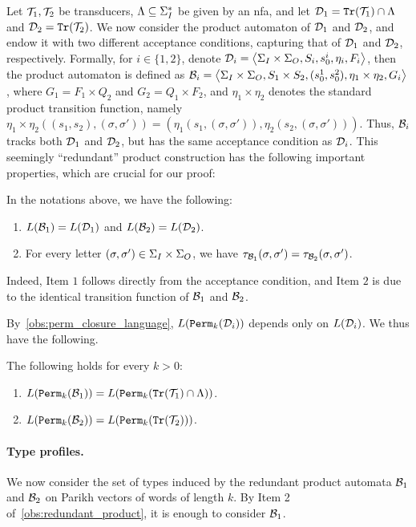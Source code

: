 Let $\mathcal{T}_1,\mathcal{T}_2$ be transducers, $\Lambda\subseteq \Sigma_{I}^*$ be given by an \gls{nfa}, and let $\mathcal{D}_1={\mathtt{Tr}}(\mathcal{T}_1)\cap \Lambda$ and $\mathcal{D}_2={\mathtt{Tr}}(\mathcal{T}_2)$. 
We now consider the product automaton of $\mathcal{D}_1$ and $\mathcal{D}_2$, and endow it with two different acceptance conditions, capturing that of $\mathcal{D}_1$ and $\mathcal{D}_2$, respectively. Formally, for $i\in \{1,2\}$, denote $\mathcal{D}_i=\left< \Sigma_{I}\times\Sigma_{O},S_i,s^i_0,\eta_i,F_i\right>$, then the product automaton is defined as $\mathcal{B}_i=\left< \Sigma_{I}\times\Sigma_{O},S_1\times S_2,(s^1_0,s^2_0),\eta_1\times \eta_2,G_i\right>$, where $G_1=F_1\times Q_2$ and $G_2=Q_1\times F_2$, and $\eta_1\times \eta_2$ denotes the standard product transition function, namely $\eta_1\times\eta_2((s_1,s_2),(\sigma,\sigma'))=(\eta_1(s_1,(\sigma,\sigma')),\eta_2(s_2,(\sigma,\sigma')))$. Thus, $\mathcal{B}_i$ tracks both $\mathcal{D}_1$ and $\mathcal{D}_2$, but has the same acceptance condition as $\mathcal{D}_i$. This seemingly ``redundant'' product construction has the following important properties, which are crucial for our proof:
\begin{observation}
	\label{obs:redundant_product}
 In the notations above, we have the following:
	\begin{enumerate}
		\item $L(\mathcal{B}_1)=L(\mathcal{D}_1)$ and $L(\mathcal{B}_2)=L(\mathcal{D}_2)$.
		\item For every letter $(\sigma,\sigma')\in \Sigma_{I}\times\Sigma_{O}$, we have $\tau_{\mathcal{B}_1}(\sigma,\sigma')=\tau_{\mathcal{B}_2}(\sigma,\sigma')$.
	\end{enumerate}
	\end{observation}
	
Indeed, Item $1$ follows directly from the acceptance condition, and Item $2$ is due to the identical transition function of $\mathcal{B}_1$ and $\mathcal{B}_2$.

By~\cref{obs:perm_closure_language}, $L({\mathtt{Perm}}_k(\mathcal{D}_i))$ depends only on $L(\mathcal{D}_i)$. We thus have the following.
\begin{observation}
	\label{obs:redundant_product_for_perm_automata}
	 The following holds for every $k>0$:
	  \begin{enumerate}
	      \item $L({\mathtt{Perm}}_k(\mathcal{B}_1))=L({\mathtt{Perm}}_k({\mathtt{Tr}}(\mathcal{T}_1)\cap \Lambda))$.
	      \item  $L({\mathtt{Perm}}_k(\mathcal{B}_2))=L({\mathtt{Perm}}_k({\mathtt{Tr}}(\mathcal{T}_2)))$.
	  \end{enumerate}
	\end{observation}

\paragraph*{Type profiles.}
We now consider the set of types induced by the redundant product automata $\mathcal{B}_1$ and $\mathcal{B}_2$ on Parikh vectors of words of length $k$. By Item 2 of~\cref{obs:redundant_product}, it is enough to consider $\mathcal{B}_1$. 

